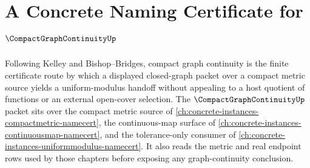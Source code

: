 \chapter{A Concrete Naming Certificate for $\CompactGraphContinuityUp$}
\label{ch:concrete-instances-compact-graph-continuity-namecert}

Following Kelley and Bishop--Bridges, compact graph continuity is the finite certificate route by which a displayed closed-graph packet over a compact metric source yields a uniform-modulus handoff without appealing to a host quotient of functions or an external open-cover selection. The $\CompactGraphContinuityUp$ packet sits over the compact metric source of \autoref{ch:concrete-instances-compactmetric-namecert}, the continuous-map surface of \autoref{ch:concrete-instances-continuousmap-namecert}, and the tolerance-only consumer of \autoref{ch:concrete-instances-uniformmodulus-namecert}. It also reads the metric and real endpoint rows used by those chapters before exposing any graph-continuity conclusion.

